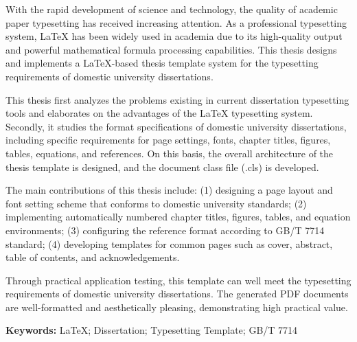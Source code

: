 \begin{eabstractpage}

With the rapid development of science and technology, the quality of academic paper typesetting has received increasing attention. As a professional typesetting system, LaTeX has been widely used in academia due to its high-quality output and powerful mathematical formula processing capabilities. This thesis designs and implements a LaTeX-based thesis template system for the typesetting requirements of domestic university dissertations.

This thesis first analyzes the problems existing in current dissertation typesetting tools and elaborates on the advantages of the LaTeX typesetting system. Secondly, it studies the format specifications of domestic university dissertations, including specific requirements for page settings, fonts, chapter titles, figures, tables, equations, and references. On this basis, the overall architecture of the thesis template is designed, and the document class file (.cls) is developed.

The main contributions of this thesis include: (1) designing a page layout and font setting scheme that conforms to domestic university standards; (2) implementing automatically numbered chapter titles, figures, tables, and equation environments; (3) configuring the reference format according to GB/T 7714 standard; (4) developing templates for common pages such as cover, abstract, table of contents, and acknowledgements.

Through practical application testing, this template can well meet the typesetting requirements of domestic university dissertations. The generated PDF documents are well-formatted and aesthetically pleasing, demonstrating high practical value.

\vspace{\baselineskip}

\noindent\hspace*{2\ccwd}%
{\textbf{Keywords: }LaTeX; Dissertation; Typesetting Template; GB/T 7714}

\end{eabstractpage}
